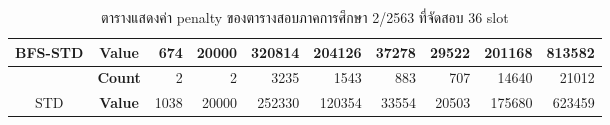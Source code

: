 \begin{table}[]
{\begin{tabular}{@{}ccrrrrrrrr@{}}
    \multirow{-2}{*}{BFS-STD}                    & \textbf{Value}                        & 674                            & 20000                          & 320814                         & 204126                         & 37278                          & 29522                          & 201168                         & 813582                           \\ \midrule
                                                  & {\textbf{Count}} & {2}       & {2}       & {3235}    & {1543}    & {883}     & {707}     & {14640}   & {21012}     \\ \cmidrule(l){2-10} 
    \multirow{-2}{*}{STD} & {\textbf{Value}} & {1038}    & {20000}   & {252330}  & {120354}  & {33554}   & {20503}   & {175680}  & {623459}    \\ \bottomrule
    \end{tabular}%
    }
    \caption{ตารางแสดงค่า penalty ของตารางสอบภาคการศึกษา 2/2563 ที่จัดสอบ 36 slot}
    \label{tab:result_table_263_36}
\end{table}
